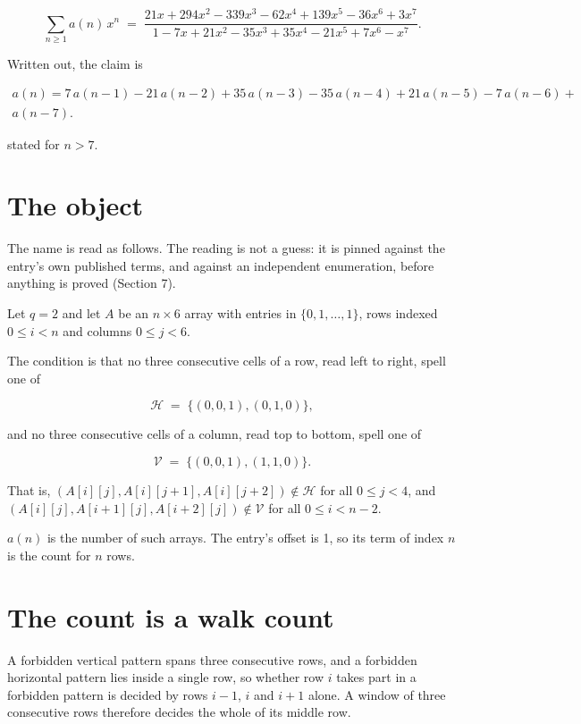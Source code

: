 \documentclass[11pt]{article}
\theoremstyle{definition}
\begin{document}
\[\sum_{n \ge 1} a(n)\,x^n \;=\; \frac{21x + 294x^{2} - 339x^{3} - 62x^{4} + 139x^{5} - 36x^{6} + 3x^{7}}{1 - 7x + 21x^{2} - 35x^{3} + 35x^{4} - 21x^{5} + 7x^{6} - x^{7}}.\]

Written out, the claim is

\begin{multline*} a(n) = 7\,a(n-1) - 21\,a(n-2) + 35\,a(n-3) - 35\,a(n-4) + 21\,a(n-5) - 7\,a(n-6) + \\ a(n-7). \end{multline*}

stated for $n > 7$.

\section{The object}

The name is read as follows. The reading is not a guess: it is pinned against the entry's own published terms, and against an independent enumeration, before anything is proved (Section 7).

Let $q = 2$ and let $A$ be an $n \times 6$ array with entries in $\{0,1,\dots,1\}$, rows indexed $0 \le i < n$ and columns $0 \le j < 6$.

The condition is that no three consecutive cells of a row, read left to right, spell one of

\[\mathcal{H} \;=\; \{(0,0,1), (0,1,0)\},\]

and no three consecutive cells of a column, read top to bottom, spell one of

\[\mathcal{V} \;=\; \{(0,0,1), (1,1,0)\}.\]

That is, $(A[i][j],A[i][j{+}1],A[i][j{+}2]) \notin \mathcal{H}$ for all $0 \le j < 4$, and $(A[i][j],A[i{+}1][j],A[i{+}2][j]) \notin \mathcal{V}$ for all $0 \le i < n-2$.

$a(n)$ is the number of such arrays. The entry's offset is 1, so its term of index $n$ is the count for $n$ rows.

\section{The count is a walk count}

A forbidden vertical pattern spans three consecutive rows, and a forbidden horizontal pattern lies inside a single row, so whether row $i$ takes part in a forbidden pattern is decided by rows $i-1$, $i$ and $i+1$ alone. A window of three consecutive rows therefore decides the whole of its middle row.
\end{document}
